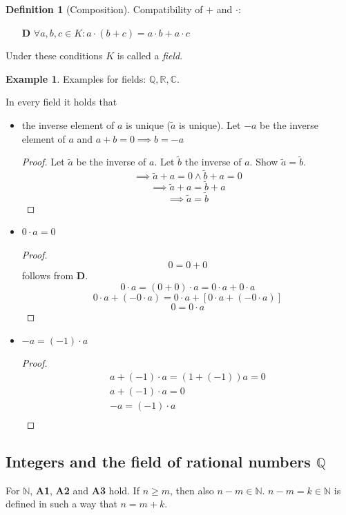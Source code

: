 \documentclass[a4paper,landscape,twocolumn]{article}
\theoremstyle{definition}
\newtheorem{defi}{Definition}
\newtheorem{ex}{Example}
\begin{document}
\begin{defi}[Composition]
  Compatibility of $+$ and $\cdot$:
  \begin{itemize}
    \item[\textbf{D}] $\forall a,b,c \in K: a \cdot (b + c) = a \cdot b + a \cdot c$
  \end{itemize}
  Under these conditions $K$ is called a \emph{field}.
\end{defi}

\begin{ex}
  Examples for fields: $\mathbb{Q}, \mathbb{R}, \mathbb{C}$.

  In every field it holds that
  \begin{itemize}
    \item the inverse element of $a$ is unique ($\tilde a$ is unique).
      Let $-a$ be the inverse element of $a$ and $a + b = 0 \implies b = -a$
      \begin{proof}
        Let $\tilde a$ be the inverse of $a$. Let $\tilde b$ the inverse of $a$.
        Show $\tilde a = \tilde b$.
        \[ \implies \tilde a + a = 0 \land \tilde b + a = 0 \]
        \[ \implies \tilde a + a = \tilde b + a \]
        \[ \implies \tilde a = \tilde b \]
      \end{proof}
    \item $0 \cdot a = 0$
      \begin{proof}
        \[ 0 = 0 + 0 \]
        follows from \textbf{D}.
        \[ 0 \cdot a = (0 + 0) \cdot a = 0 \cdot a + 0 \cdot a \]
        \[ 0 \cdot a + (-0 \cdot a) = 0 \cdot a + \left[0 \cdot a + (-0 \cdot a)\right] \]
        \[ 0 = 0 \cdot a \]
      \end{proof}
    \item $-a = (-1) \cdot a$
      \begin{proof}
        \begin{align*}
          a + (-1) \cdot a = (1 + (-1)) a = 0 \\
          a + (-1) \cdot a = 0 \\
          -a = (-1) \cdot a \\
        \end{align*}
      \end{proof}
  \end{itemize}
\end{ex}

\subsection{Integers and the field of rational numbers $\mathbb{Q}$}
%
For $\mathbb{N}$, \textbf{A1}, \textbf{A2} and \textbf{A3} hold.
If $n \geq m$, then also $n - m \in \mathbb{N}$.
$n-m = k \in \mathbb{N}$ is defined in such a way that $n = m + k$.
\end{document}
